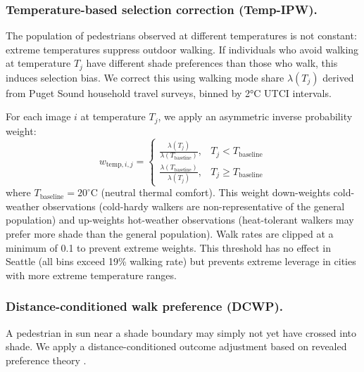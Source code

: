 \documentclass{ifacconf}
\begin{document}
  \subsubsection{Temperature-based selection correction (Temp-IPW).}
  The population of pedestrians observed at different temperatures is not constant: extreme temperatures suppress outdoor walking. If
   individuals who avoid walking at temperature $T_j$ have different shade preferences than those who walk, this induces selection
  bias. We correct this using walking mode share $\lambda(T_j)$ derived from Puget Sound household travel surveys, binned by 2°C
  UTCI intervals.

  For each image $i$ at temperature $T_j$, we apply an asymmetric inverse probability weight:
  \begin{equation}
  w_{\text{temp},i,j} =
  \begin{cases}
  \frac{\lambda(T_j)}{\lambda(T_{\text{baseline}})}, & T_j < T_{\text{baseline}} \\[6pt]
  \frac{\lambda(T_{\text{baseline}})}{\lambda(T_j)}, & T_j \geq T_{\text{baseline}}
  \end{cases}
  \end{equation}
  where $T_{\text{baseline}} = 20^{\circ}$C (neutral thermal comfort). This weight down-weights cold-weather observations (cold-hardy
   walkers are non-representative of the general population) and up-weights hot-weather observations (heat-tolerant walkers may
  prefer more shade than the general population). Walk rates are clipped at a minimum of 0.1 to prevent extreme weights. This threshold has no effect in Seattle (all bins exceed 19\% walking rate) but prevents extreme leverage in cities with more extreme temperature ranges.

  \subsubsection{Distance-conditioned walk preference (DCWP).}
  A pedestrian in sun near a shade boundary may simply not yet have crossed into shade. We   apply a distance-conditioned outcome adjustment based on revealed preference theory \citep{Samuelson1948Revealed}.
\end{document}

